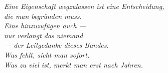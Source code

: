 \begin{geschichte}
\begin{center}
\end{center}
\end{geschichte}

\bigskip
\begin{flushright}
\itshape\color{grau}
Eine Eigenschaft wegzulassen ist eine Entscheidung,\\
die man begründen muss.\\
Eine hinzuzufügen auch ---\\
nur verlangt das niemand.\\[10pt]
\normalfont\color{grau}\upshape
--- der Leitgedanke dieses Bandes.\\
\itshape Was fehlt, sieht man sofort.\\
Was zu viel ist, merkt man erst nach Jahren.
\end{flushright}
